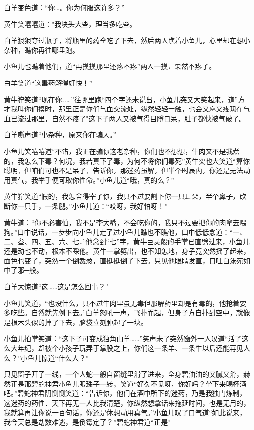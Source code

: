 \documentclass[12pt,oneside]{book}
\begin{document}
白羊变色道：``你\ldots。你为何服这许多？''

黄牛笑嘻嘻道："我块头大些，理当多吃些。

白羊狠狠夺过瓶子，将瓶里的药全吃了下去，然后两人瞧着小鱼儿，心里却在想小杂种，瞧你再往哪里跑。

小鱼儿也瞧着他们，道``再摸摸那里还疼不疼''两人一摸，果然不疼了。

白羊笑道``这毒药解得好快！''

黄牛狞笑道``现在你\ldots\ldots{}''往哪里跑``四个字还未说出，小鱼儿突又大笑起来，道''方才我叫你们摸时，那里正是你们气血交流处，纵然轻轻一触，也会又麻又疼现在气血已流过那里，自然不疼了"这下子两人又被气得目瞪口呆，肚子都快被气破了。

白羊嘶声道``小杂种，原来你在骗人。''

小鱼儿笑嘻嘻道``不错，我正在骗你这老杂种，你们也不想想，牛肉又不是我煮的，我怎么下毒？何况，我若真下了毒，为何不将你们毒死''黄牛突也大笑道``算你聪明，但咱们可也不是呆子，告诉你，那迷药虽解，但半个时辰内，你还是无法动用真气，我举手便可取你性命。''小鱼儿道``哦，真的么？''

黄牛狞笑道``假的，我怎舍得宰了你，我只不过要割下你一只耳朵，半个鼻子，砍断你一只手，一条腿。''小鱼儿道：``哎呀，我好怕呀！''

黄牛道：``你不必害怕，我不是李大嘴，不会吃你的，我只不过要把你的肉拿去喂狗。''口中说话，一步步向小鱼儿走了过小鱼儿瞧也不瞧他，口中低低念道：``一、二、叁、四、五、六、七．''他念到``七''字，黄牛巨灵般的手掌已直劈过来，小鱼儿还是动也不动，根本不睬他。黄牛一掌劈出，也不知怎地，身子竟突然摇了起来，面色也变了，突然一个倒裁葱，直挺挺倒了下去。只见他眼睛发直，口吐白沫宛如中了邪─般。

白羊大惊道``这\ldots\ldots 这是怎么回事？''

小鱼儿笑道，``也没什么，只不过牛肉里虽无毒但那解药里却是有毒的，他抢着要多吃些。自然就先例下去。''白羊怒吼一声，飞扑而起，但身子方自扑到空中，就像是根木头似的掉了下去，脑袋立刻肿起了一块。

小鱼儿拍掌笑道：``这下子可变成独角山羊\ldots\ldots{}''笑声未了突然窗外一人叹道``活了这么大年纪，却被个小孩子玩弄于掌股之上，你们这一条羊、一条牛以后还能再见人么？''小鱼儿惊道``什么人？''

只见窗子开了一线，一个人蛇一般自窗缝里滑了进来，全身碧油油的又腻又滑，赫然正是那碧蛇神君小鱼儿眼珠子一转，笑道``好久不见呀，你好吗？坐下来喝杯酒吧。''碧蛇神君阴恻恻笑道：``告诉你，他们在酒中所下的迷药，乃是我独门炼制，这迷药的药性．天下再无一人比我清楚，你纵然想拿话来拖延时间，也是无用的，我就算再让你说一百句话，你还是休想动用真气。''小鱼儿叹了口气道``如此说来，我今天总是劫数难逃，是倒霉定了？''碧蛇神君道``正是''
\end{document}
